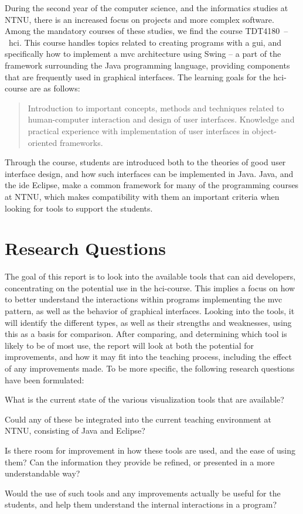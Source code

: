 During the second year of the computer science, and the informatics studies at NTNU, there is an increased focus on projects and more complex software.
Among the mandatory courses of these studies, we find the course TDT4180~--~\gls{hci}.
This course handles topics related to creating programs with a \gls{gui}, and specifically how to implement a \gls{mvc} architecture using Swing -- a part of the framework surrounding the Java programming language, providing components that are frequently used in graphical interfaces.
The learning goals for the \gls{hci}-course are as follows:
\begin{quote}
Introduction to important concepts, methods and techniques related to human-computer interaction and design of user interfaces.
Knowledge and practical experience with implementation of user interfaces in object-oriented frameworks.
\end{quote}
Through the course, students are introduced both to the theories of good user interface design, and how such interfaces can be implemented in Java.
Java, and the \gls{ide} Eclipse, make a common framework for many of the programming courses at NTNU, which makes compatibility with them an important criteria when looking for tools to support the students.

\section{Research Questions}\label{intro-RQs}

The goal of this report is to look into the available tools that can aid developers, concentrating on the potential use in the \gls{hci}-course.
This implies a focus on how to better understand the interactions within programs implementing the \gls{mvc} pattern, as well as the behavior of graphical interfaces.
Looking into the tools, it will identify the different types, as well as their strengths and weaknesses, using this as a basis for comparison.
After comparing, and determining which tool is likely to be of most use, the report will look at both the potential for improvements, and how it may fit into the teaching process, including the effect of any improvements made.
To be more specific, the following research questions have been formulated:
\begin{theorem}
What is the current state of the various visualization tools that are available?
\end{theorem}
\begin{theorem}
Could any of these be integrated into the current teaching environment at NTNU, consisting of Java and Eclipse? %
\end{theorem}
\begin{theorem}
Is there room for improvement in how these tools are used, and the ease of using them? Can the information they provide be refined, or presented in a more understandable way? %
\end{theorem}
\begin{theorem}
Would the use of such tools and any improvements actually be useful for the students, and help them understand the internal interactions in a program?%
\end{theorem}
